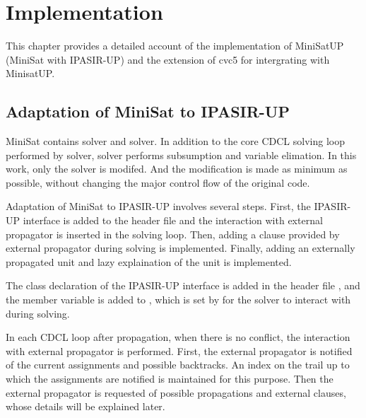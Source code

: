 \chapter{Implementation}

This chapter provides a detailed account of the implementation of MiniSatUP (MiniSat with IPASIR-UP) and the extension of cvc5 for intergrating with MinisatUP.

\section{Adaptation of MiniSat to IPASIR-UP}

MiniSat contains  solver and  solver. In addition to the core CDCL solving loop performed by  solver,  solver performs subsumption and variable elimation. In this work, only the  solver is modifed. And the modification is made as minimum as possible, without changing the major control flow of the original code.


Adaptation of MiniSat to IPASIR-UP involves several steps. First, the IPASIR-UP interface is added to the header file and the interaction with external propagator is inserted in the solving loop. Then, adding a clause provided by external propagator during solving is implemented. Finally, adding an externally propagated unit and lazy explaination of the unit is implemented.


The  class declaration of the IPASIR-UP interface is added in the header file , and the  member variable is added to , which is set by  for the solver to interact with during solving.

In each CDCL loop after propagation, when there is no conflict, the interaction with external propagator is performed. First, the external propagator is notified of the current assignments and possible backtracks. An index on the trail up to which the assignments are notified is maintained for this purpose. Then the external propagator is requested of possible propagations and external clauses, whose details will be explained later.


